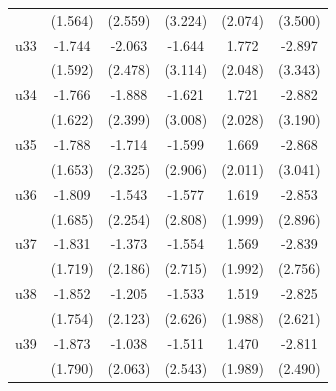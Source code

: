 \begin{table}[htbp]
\begin{tabular}{l*{5}{c}}
                    &     (1.564)         &     (2.559)         &     (3.224)         &     (2.074)         &     (3.500)         \\
\addlinespace
u33                 &      -1.744         &      -2.063         &      -1.644         &       1.772         &      -2.897         \\
                    &     (1.592)         &     (2.478)         &     (3.114)         &     (2.048)         &     (3.343)         \\
\addlinespace
u34                 &      -1.766         &      -1.888         &      -1.621         &       1.721         &      -2.882         \\
                    &     (1.622)         &     (2.399)         &     (3.008)         &     (2.028)         &     (3.190)         \\
\addlinespace
u35                 &      -1.788         &      -1.714         &      -1.599         &       1.669         &      -2.868         \\
                    &     (1.653)         &     (2.325)         &     (2.906)         &     (2.011)         &     (3.041)         \\
\addlinespace
u36                 &      -1.809         &      -1.543         &      -1.577         &       1.619         &      -2.853         \\
                    &     (1.685)         &     (2.254)         &     (2.808)         &     (1.999)         &     (2.896)         \\
\addlinespace
u37                 &      -1.831         &      -1.373         &      -1.554         &       1.569         &      -2.839         \\
                    &     (1.719)         &     (2.186)         &     (2.715)         &     (1.992)         &     (2.756)         \\
\addlinespace
u38                 &      -1.852         &      -1.205         &      -1.533         &       1.519         &      -2.825         \\
                    &     (1.754)         &     (2.123)         &     (2.626)         &     (1.988)         &     (2.621)         \\
\addlinespace
u39                 &      -1.873         &      -1.038         &      -1.511         &       1.470         &      -2.811         \\
                    &     (1.790)         &     (2.063)         &     (2.543)         &     (1.989)         &     (2.490)         \\

\end{tabular}
\end{table}
